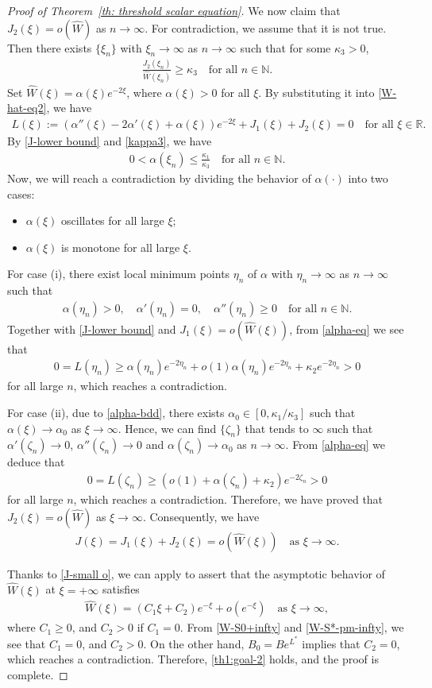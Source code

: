 \documentclass[11pt,a4paper]{article}
\numberwithin{equation}{section}
\numberwithin{figure}{section}
\newcommand\bea{\begin{eqnarray}}
\newcommand\eea{\end{eqnarray}}
\newcommand\beaa{\begin{eqnarray*}}
\newcommand\eeaa{\end{eqnarray*}}
\begin{document}
\begin{proof}[Proof of Theorem~\ref{th: threshold scalar equation}]
We now claim that $J_2(\xi)=o(\widehat{W})$ as $n\to\infty$.
For contradiction, we assume that it is not true. Then there exists $\{\xi_n\}$ with
$\xi_n\to\infty$ as $n\to\infty$ such that for some $\kappa_3>0$,
\bea\label{kappa3}
\frac{J_2(\xi_n)}{\widehat{W}(\xi_n)}\geq \kappa_3\quad \mbox{for all $n\in\mathbb{N}$.}
\eea
Set $\widehat{W}(\xi)=\alpha(\xi)e^{-2\xi}$, where $\alpha(\xi)>0$ for all $\xi$.
By substituting it into \eqref{W-hat-eq2},
we have 
\bea\label{alpha-eq}
L(\xi):=(\alpha''(\xi)-2\alpha'(\xi)+\alpha(\xi))e^{-2\xi}+J_1(\xi)+J_2(\xi)=0\quad \mbox{for all $\xi\in\mathbb{R}$}.
\eea
By \eqref{J-lower bound} and \eqref{kappa3}, we have 
\bea\label{alpha-bdd}
0<\alpha(\xi_n)\leq \frac{\kappa_1}{\kappa_3}\quad  \mbox{for all $n\in\mathbb{N}$.}
\eea
Now, we will reach a contradiction by dividing the behavior of $\alpha(\cdot)$ into two cases:
\begin{itemize}
    \item[(i)] $\alpha(\xi)$ oscillates for all large $\xi$;
    \item[(ii)] $\alpha(\xi)$ is monotone for all large $\xi$.
\end{itemize}
For case (i), there exist local minimum points $\eta_n$ of $\alpha$ with $\eta_n\to\infty$ as $n\to\infty$ such that
\beaa
\alpha(\eta_n)>0,\quad \alpha'(\eta_n)=0,\quad \alpha''(\eta_n)\geq 0\quad  \mbox{for all $n\in\mathbb{N}$.}
\eeaa
Together with \eqref{J-lower bound} and $J_1(\xi)=o(\hat W(\xi))$,
from \eqref{alpha-eq} we see that
\beaa
0=L(\eta_n)\geq \alpha(\eta_n)e^{-2\eta_n}+o(1)\alpha(\eta_n)e^{-2\eta_n}+\kappa_2e^{-2\eta_n}>0
\eeaa
for all large $n$, which reaches a contradiction. 

For case (ii),
due to \eqref{alpha-bdd}, there exists $\alpha_0\in[0, \kappa_1/\kappa_3]$
such that $\alpha(\xi)\to \alpha_0$ as $\xi\to\infty$. Hence, we can find $\{\zeta_n\}$ that tends to $\infty$ such that $\alpha'(\zeta_n)\to0$, $\alpha''(\zeta_n)\to0$ and
$\alpha(\zeta_n)\to \alpha_0$ as $n\to\infty$.
From \eqref{alpha-eq} we deduce that
\beaa
0=L(\zeta_n)\geq (o(1)+\alpha(\zeta_n)+ \kappa_2)e^{-2\zeta_n}>0
\eeaa
for all large $n$, which reaches a contradiction. 
Therefore, we have proved that
$J_2(\xi)=o(\widehat{W})$ as $\xi\to\infty$.
Consequently, we have
\bea\label{J-small o}
J(\xi)=J_1(\xi)+J_2(\xi)=o(\widehat{W}(\xi))\quad \mbox{as $\xi\to\infty$.}
\eea


Thanks to \eqref{J-small o}, we can apply
\cite[Chapter 3, Theorem 8.1]{CoddingtonLevison} to assert that
the asymptotic behavior of $\widehat{W}(\xi)$ at $\xi=+\infty$ satisfies
\beaa
\widehat{W}(\xi)=(C_1\xi+C_2)e^{-\xi}+o(e^{-\xi})\quad \mbox{as $\xi\to\infty$},
\eeaa
where  $C_1\geq0$, and $C_2>0$ if $C_1=0$. From \eqref{W-S0+infty} and \eqref{W-S*-pm-infty}, we see that $C_1=0$, and $C_2>0$. On the other hand, $B_0=Be^{ L^*}$ implies that $C_2=0$, which reaches a contradiction.
Therefore, \eqref{th1:goal-2} holds, and the proof is complete.
\end{proof}
\end{document}
